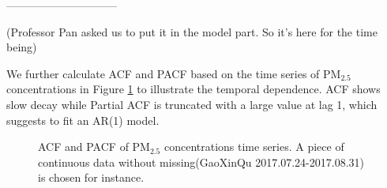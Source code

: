 \documentclass[12pt]{article}
\numberwithin{equation}{section}
\begin{document}
\newpage
------------------------------

(Professor Pan asked us to put it in the model part. So it's here for the time being)

We further calculate ACF and PACF based on the time series of PM$_{2.5}$ concentrations  in Figure \ref{fig:ACFPACF} to illustrate the temporal dependence. ACF shows slow decay while Partial ACF is truncated with a large value at lag 1, which suggests to fit an AR(1) model. 

\begin{figure}[htbp]
	\centering
	\caption{\footnotesize ACF and PACF of PM$_{2.5}$ concentrations time series. A piece of continuous data without missing(GaoXinQu 2017.07.24-2017.08.31) is chosen for instance.}
	\label{fig:ACFPACF}
\end{figure}

\newpage


\end{document}
